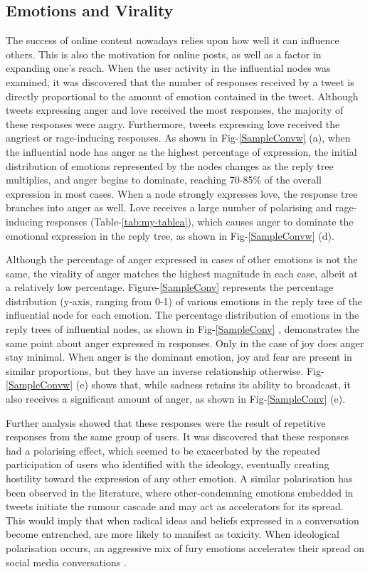 \documentclass[acmtog]{acmart}
\begin{document}
\subsection{Emotions and Virality}
The success of online content nowadays relies upon how well it can influence others. This is also the motivation for online posts, as well as a factor in expanding one's reach. When the user activity in the influential nodes was examined, it was discovered that the number of responses received by a tweet is directly proportional to the amount of emotion contained in the tweet. Although tweets expressing anger and love received the most responses, the majority of these responses were angry. Furthermore, tweets expressing love received the angriest or rage-inducing responses. As shown in Fig-\ref{SampleConvw} (a), when the influential node has anger as the highest percentage of expression, the initial distribution of emotions represented by the nodes changes as the reply tree multiplies, and anger begins to dominate, reaching 70-85\% of the overall expression in most cases. When a node strongly expresses love, the response tree branches into anger as well. Love receives a large number of polarising and rage-inducing responses (Table-\ref{tab:my-tablea}), which causes anger to dominate the emotional expression in the reply tree, as shown in Fig-\ref{SampleConvw}  (d).

Although the percentage of anger expressed in cases of other emotions is not the same, the virality of anger matches the highest magnitude in each case, albeit at a relatively low percentage. Figure-\ref{SampleConv} represents the percentage distribution (y-axis, ranging from 0-1) of various emotions in the reply tree of the influential node for each emotion. The percentage distribution of emotions in the reply trees of influential nodes, as shown in Fig-\ref{SampleConv} , demonstrates the same point about anger expressed in responses. Only in the case of joy does anger stay minimal. When anger is the dominant emotion, joy and fear are present in similar proportions, but they have an inverse relationship otherwise. Fig-\ref{SampleConvw}  (e) shows that, while sadness retains its ability to broadcast, it also receives a significant amount of anger, as shown in Fig-\ref{SampleConv}  (e).

Further analysis showed that these responses were the result of repetitive responses from the same group of users. It was discovered that these responses had a polarising effect, which seemed to be exacerbated by the repeated participation of users who  identified with the ideology, eventually creating hostility toward the expression of any other emotion. A similar polarisation has been observed in the literature, where other-condemning emotions embedded in tweets initiate the rumour cascade and may act as accelerators for its spread. This would imply that when radical ideas and beliefs expressed in a conversation become entrenched, are more likely to manifest as toxicity. When ideological polarisation occurs, an aggressive mix of fury emotions accelerates their spread on social media conversations \cite{solovev2022moral}.  
\end{document}
